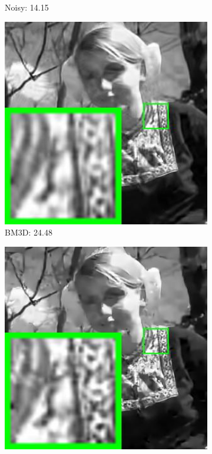 \begin{figure}
\begin{subfigure}[t]{0.24\textwidth}
		\caption{Noisy: 14.15}
    \end{subfigure}
    \hfill
    \begin{subfigure}[t]{0.24\textwidth}
        \centering
        \includegraphics[width=1\textwidth]{images/pgpd/200img/br_BM3D_50_258089.jpg}
		\caption{BM3D: 24.48}
    \end{subfigure}
    \hfill
    \begin{subfigure}[t]{0.24\textwidth}
        \centering
        \includegraphics[width=1\textwidth]{images/pgpd/200img/br_EPLL_50_258089.jpg}

\end{subfigure}
\end{figure}
